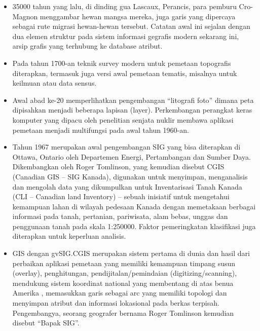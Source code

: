 \begin{itemize}
\item 35000 tahun yang lalu, di dinding gua Lascaux, Perancis, para pemburu Cro-Magnon menggambar hewan mangsa mereka, juga garis yang dipercaya sebagai rute migrasi hewan-hewan tersebut. Catatan awal ini sejalan dengan dua elemen struktur pada sistem informasi gegrafis modern sekarang ini, arsip grafis yang terhubung ke database atribut.

\item Pada tahun 1700-an teknik survey modern untuk pemetaan topografis diterapkan, termasuk juga versi awal pemetaan tematis, misalnya untuk keilmuan atau data sensus.

\item Awal abad ke-20 memperlihatkan pengembangan “litografi foto” dimana peta dipisahkan menjadi beberapa lapisan (layer). Perkembangan perangkat keras komputer yang dipacu oleh penelitian senjata nuklir membawa aplikasi pemetaan menjadi multifungsi pada awal tahun 1960-an.

\item Tahun 1967 merupakan awal pengembangan SIG yang bisa diterapkan di Ottawa, Ontario oleh Departemen Energi, Pertambangan dan Sumber Daya. Dikembangkan oleh Roger Tomlinson, yang kemudian disebut CGIS (Canadian GIS – SIG Kanada), digunakan untuk menyimpan, menganalisis dan mengolah data yang dikumpulkan untuk Inventarisasi Tanah Kanada (CLI – Canadian land Inventory) – sebuah inisiatif untuk mengetahui kemampuan lahan di wilayah pedesaan Kanada dengan memetakaan berbagai informasi pada tanah, pertanian, pariwisata, alam bebas, unggas dan penggunaan tanah pada skala 1:250000. Faktor pemeringkatan klasifikasi juga diterapkan untuk keperluan analisis.

\item GIS dengan gvSIG.CGIS merupakan sistem pertama di dunia dan hasil dari perbaikan aplikasi pemetaan yang memiliki kemampuan timpang susun (overlay), penghitungan, pendijitalan/pemindaian (digitizing/scanning), mendukung sistem koordinat national yang membentang di atas benua Amerika , memasukkan garis sebagai arc yang memiliki topologi dan menyimpan atribut dan informasi lokasional pada berkas terpisah. Pengembangya, seorang geografer bernama Roger Tomlinson kemudian disebut “Bapak SIG”.


\end{itemize}
